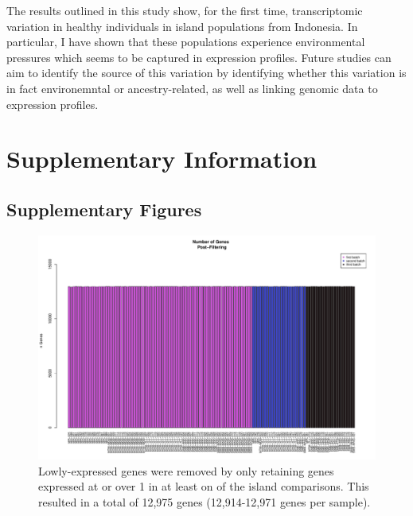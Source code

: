 \documentclass[12pt,a4paper,titlepage,twoside,openright]{book}
\begin{document}
\begin{mainmatter}
{{The results outlined in this study show, for the first time, transcriptomic variation in healthy individuals in island populations from Indonesia. In particular, I have shown that these populations experience environmental pressures which seems to be captured in expression profiles. Future studies can aim to identify the source of this variation by identifying whether this variation is in fact environemntal or ancestry-related, as well as linking genomic data to expression profiles. 



\chapter{Supplementary Information}\label{}

\section{Supplementary Figures}

\begin{figure}[htb!]
\centering
\includegraphics[width=\textwidth,height=\textheight,keepaspectratio]{Figures/nGenes_indoRNA_postFiltering_123Combined.pdf}
\caption{Lowly-expressed genes were removed by only retaining genes expressed at or over 1 in at least on of the island comparisons. This resulted in a total of 12,975 genes (12,914-12,971 genes per sample).}
\label{fig:Total Genes Post Filtering}
\end{figure}


}}
\end{mainmatter}
\end{document}
